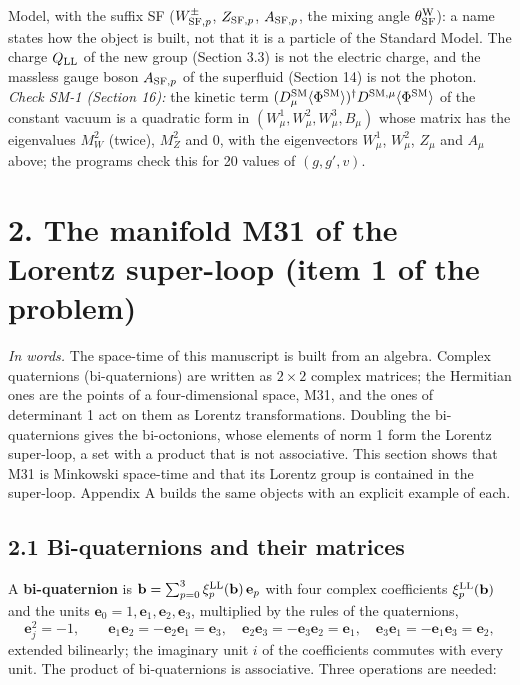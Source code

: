 \documentclass[
  10pt,
]{article}
\begin{document}
Model, with the suffix SF (\(W^\pm_{{\rm SF},p}\), \(Z_{{\rm SF},p}\),
\(A_{{\rm SF},p}\), the mixing angle \(\theta^{\rm W}_{\rm SF}\)): a
name states how the object is built, not that it is a particle of the
Standard Model. The charge \(Q_{\rm LL}\) of the new group (Section 3.3)
is not the electric charge, and the massless gauge boson
\(A_{{\rm SF},p}\) of the superfluid (Section 14) is not the photon.
\emph{Check SM-1 (Section 16):} the kinetic term
\((D^{\rm SM}_\mu\langle\Phi^{\rm SM}\rangle)^\dagger D^{{\rm SM},\mu}\langle\Phi^{\rm SM}\rangle\)
of the constant vacuum is a quadratic form in
\((W^1_\mu,W^2_\mu,W^3_\mu,B_\mu)\) whose matrix has the eigenvalues
\(M_W^2\) (twice), \(M_Z^2\) and \(0\), with the eigenvectors
\(W^1_\mu\), \(W^2_\mu\), \(Z_\mu\) and \(A_\mu\) above; the programs
check this for 20 values of \((g,g',v)\).

\hypertarget{the-manifold-m31-of-the-lorentz-super-loop-item-1-of-the-problem}{%
\section{2. The manifold M31 of the Lorentz super-loop (item 1 of the
problem)}\label{the-manifold-m31-of-the-lorentz-super-loop-item-1-of-the-problem}}

\emph{In words.} The space-time of this manuscript is built from an
algebra. Complex quaternions (bi-quaternions) are written as
\(2\times2\) complex matrices; the Hermitian ones are the points of a
four-dimensional space, M31, and the ones of determinant 1 act on them
as Lorentz transformations. Doubling the bi-quaternions gives the
bi-octonions, whose elements of norm 1 form the Lorentz super-loop, a
set with a product that is not associative. This section shows that M31
is Minkowski space-time and that its Lorentz group is contained in the
super-loop. Appendix A builds the same objects with an explicit example
of each.

\hypertarget{bi-quaternions-and-their-matrices}{%
\subsection{2.1 Bi-quaternions and their
matrices}\label{bi-quaternions-and-their-matrices}}

A \textbf{bi-quaternion} is
\(\mathbf b=\sum_{p=0}^3\xi^{\rm LL}_p(\mathbf b)\,\mathbf e_p\) with
four complex coefficients \(\xi^{\rm LL}_p(\mathbf b)\) and the units
\(\mathbf e_0=1,\mathbf e_1,\mathbf e_2,\mathbf e_3\), multiplied by the
rules of the quaternions,
\[\mathbf e_j^2=-1,\qquad\mathbf e_1\mathbf e_2=-\mathbf e_2\mathbf e_1=\mathbf e_3,\quad\mathbf e_2\mathbf e_3=-\mathbf e_3\mathbf e_2=\mathbf e_1,\quad\mathbf e_3\mathbf e_1=-\mathbf e_1\mathbf e_3=\mathbf e_2,\tag{2.1}\]
extended bilinearly; the imaginary unit \(i\) of the coefficients
commutes with every unit. The product of bi-quaternions is associative.
Three operations are needed:
\end{document}
